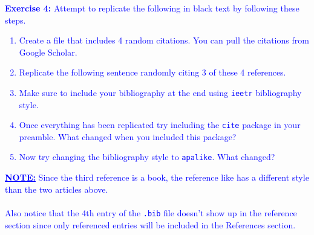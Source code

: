\documentclass[]{article}
\newcommand{\BlueText}[1]{\textcolor{blue}{#1}}
\begin{document}
\noindent \BlueText{\textbf{Exercise 4:} Attempt to replicate the following in black text by following these steps.} \vspace*{0.5cm}

\BlueText{
\begin{enumerate}[label=\textbf{Step \arabic*:}]
	\item Create a \hologo{BibTeX} file that includes 4 random citations.
	You can pull the citations from Google Scholar.
	\item Replicate the following sentence randomly citing 3 of these 4 references.
	\item Make sure to include your bibliography at the end using \texttt{ieetr} bibliography style.
	\item Once everything has been replicated try including the \texttt{cite} package in your preamble.
	What changed when you included this package?
	\item Now try changing the bibliography style to \texttt{apalike}.
	What changed?
\end{enumerate}
}

\vspace{1cm}




\noindent \BlueText{\textbf{\underline{NOTE:}} Since the third reference is a book, the reference like has a different style than the two articles above.\\\\
Also notice that the 4th entry of the \texttt{.bib} file doesn't show up in the reference section since only referenced entries will be included in the References section.}
\end{document}
